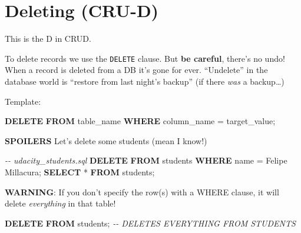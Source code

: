 \documentclass[11pt]{article}
\newenvironment{Shaded}{}{}
\newcommand{\KeywordTok}[1]{\textcolor[rgb]{0.00,0.44,0.13}{\textbf{{#1}}}}
\newcommand{\StringTok}[1]{\textcolor[rgb]{0.25,0.44,0.63}{{#1}}}
\newcommand{\CommentTok}[1]{\textcolor[rgb]{0.38,0.63,0.69}{\textit{{#1}}}}
\newcommand{\NormalTok}[1]{{#1}}
\newcommand{\OperatorTok}[1]{\textcolor[rgb]{0.40,0.40,0.40}{{#1}}}
\begin{document}
    \hypertarget{deleting-cru-d}{%
\section{\texorpdfstring{Deleting
(CRU-\textbf{D})}{Deleting (CRU-D)}}\label{deleting-cru-d}}

This is the D in CRUD.

To delete records we use the \texttt{DELETE} clause. But \textbf{be
careful}, there's no undo! When a record is deleted from a DB it's gone
for ever. ``Undelete'' in the database world is ``restore from last
night's backup'' (if there \emph{was} a backup\ldots)

Template:

\begin{Shaded}
\begin{Highlighting}[]
\KeywordTok{DELETE} \KeywordTok{FROM}\NormalTok{ table\_name }\KeywordTok{WHERE}\NormalTok{ column\_name }\OperatorTok{=}\NormalTok{ target\_value;}
\end{Highlighting}
\end{Shaded}

\textbf{SPOILERS} Let's delete some students (mean I know!)

\begin{Shaded}
\begin{Highlighting}[]
\CommentTok{{-}{-} udacity\_students.sql}
\KeywordTok{DELETE} \KeywordTok{FROM}\NormalTok{ students }\KeywordTok{WHERE}\NormalTok{ name }\OperatorTok{=} \StringTok{\textquotesingle{}Felipe Millacura\textquotesingle{}}\NormalTok{;}
\KeywordTok{SELECT} \OperatorTok{*} \KeywordTok{FROM}\NormalTok{ students;}
\end{Highlighting}
\end{Shaded}

\textbf{WARNING}: If you don't specify the row(s) with a WHERE clause,
it will delete \emph{everything} in that table!

\begin{Shaded}
\begin{Highlighting}[]
\KeywordTok{DELETE} \KeywordTok{FROM}\NormalTok{ students; }\CommentTok{{-}{-} DELETES EVERYTHING FROM STUDENTS}
\end{Highlighting}
\end{Shaded}

    


    
    
    
\end{document}

